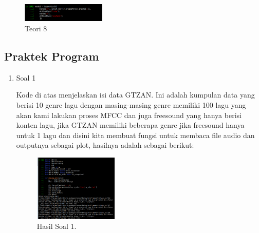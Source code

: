 \begin{enumerate}
	\begin{figure}[H]
	\centering
		\includegraphics[width=4cm]{figures/1174015/6/materi/teori8.PNG}
		\caption{Teori 8}
	\end{figure}
\end{enumerate}

\subsection{Praktek Program}
\begin{enumerate}
	\item Soal 1
	\hfill\break
	
	Kode di atas menjelaskan isi data GTZAN. Ini adalah kumpulan data yang berisi 10 genre lagu dengan masing-masing genre memiliki 100 lagu yang akan kami lakukan proses MFCC dan juga freesound yang hanya berisi konten lagu, jika GTZAN memiliki beberapa genre jika freesound hanya untuk 1 lagu dan disini kita membuat fungsi untuk membaca file audio dan outputnya sebagai plot, hasilnya adalah sebagai berikut:
	\begin{figure}[H]
	\centering
		\includegraphics[width=4cm]{figures/1174015/6/materi/hasil1.PNG}
		\caption{Hasil Soal 1.}
	\end{figure}


\end{enumerate}
